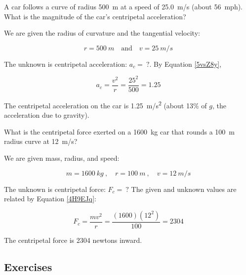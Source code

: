 \documentclass[main-physics.tex]{subfiles}
\begin{document}
\begin{example}
    A car follows a curve of radius \SI{500}{m} at a speed of \SI{25.0}{m/s} (about \SI{56}{mph}). What is the magnitude of the car's centripetal acceleration?
\end{example}

\Solution We are given the radius of curvature and the tangential velocity:

\begin{equation*}
    r = \SI{500}{m} \quad \text{and} \quad v = \SI{25}{m/s}
\end{equation*}

The unknown is centripetal acceleration: $a_c =\ ?$. By Equation \eqref{5vsZ8y},

\begin{equation*}
    a_c = \frac{v^2}{r} = \frac{25^2}{500} = 1.25 
\end{equation*}

The centripetal acceleration on the car is \SI{1.25}{m/s^2} (about 13\% of $g$, the acceleration due to gravity).

\endsolution

\begin{example}
    What is the centripetal force exerted on a \SI{1600}{kg} car that rounds a \SI{100}{m} radius curve at \SI{12}{m/s}?
\end{example}

\Solution We are given mass, radius, and speed:

\begin{equation*}
    m = \SI{1600}{kg}\ , \quad 
    r = \SI{100}{m}\ , \quad
    v = \SI{12}{m/s}
\end{equation*}

The unknown is centripetal force: $F_c =\ ?$ The given and unknown values are related by Equation \eqref{4H9EJq}:

\begin{equation*}
    F_c = \frac{m v^2}{r} = \frac{(1600)(12^2)}{100} = 2304
\end{equation*}

The centripetal force is 2304 newtons inward. 

\endsolution

\subsection{Exercises}

\subsubsection*{}
\end{document}
